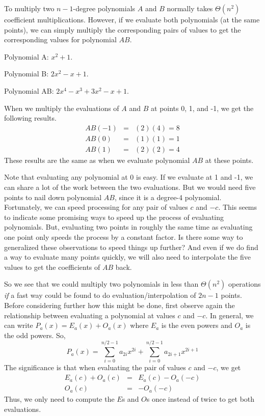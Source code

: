 To multiply two $n-1$-degree polynomials $A$ and $B$ normally takes
$\Theta(n^2)$ coefficient multiplications.
However, if we evaluate both polynomials (at the same points), we can
simply multiply the corresponding pairs of values to get the
corresponding values for polynomial $AB$.

\begin{example}

Polynomial A: $x^2 + 1$.

Polynomial B: $2x^2 - x + 1$.

Polynomial AB: $2x^4 - x^3 + 3x^2 - x + 1$.

When we multiply the evaluations of $A$ and $B$ at points 0, 1, and
-1, we get the following results.
\begin{eqnarray*}
AB(-1) &=& (2)(4) = 8\\
AB(0) &=& (1)(1) = 1\\
AB(1) &=& (2)(2) = 4
\end{eqnarray*}
\noindent These results are the same as when we evaluate polynomial
$AB$ at these points.
\end{example}

Note that evaluating any polynomial at 0 is easy.
If we evaluate at 1 and -1, we can share a lot of the work
between the two evaluations.
But we would need five points to nail down polynomial $AB$,
since it is a degree-4 polynomial.
Fortunately, we can speed processing for any pair of values $c$ and
$-c$.
This seems to indicate some promising ways to speed up the process of
evaluating polynomials.
But, evaluating two points in roughly the same time as evaluating one
point only speeds the process by a constant factor.
Is there some way to generalized these observations to speed things up
further?
And even if we do find a way to evaluate many points quickly, we will
also need to interpolate the five values to get the coefficients of
$AB$ back.

So we see that we could multiply two polynomials in less than
$\Theta(n^2)$ operations \emph{if} a fast way could be 
found to do evaluation/interpolation of $2n -1$ points.
Before considering further how this might be done, first observe again
the relationship between evaluating a polynomial at values $c$ and
$-c$.
In general, we can write $P_a(x) = E_a(x) + O_a(x)$ where $E_a$ is the
even powers and $O_a$ is the odd powers. So,
\[P_a(x) = \sum_{i=0}^{n/2-1} a_{2i} x^{2i} +
           \sum_{i=0}^{n/2-1} a_{2i+1} x^{2i+1}\]
\noindent The significance is that when evaluating the pair of values
$c$ and $-c$, we get
\begin{eqnarray*}
E_a(c) + O_a(c) &=& E_a(c) - O_a(-c)\\
O_a(c) &=& - O_a(-c)
\end{eqnarray*}
\noindent Thus, we only need to compute the $E$s and $O$s once instead
of twice to get both evaluations.

